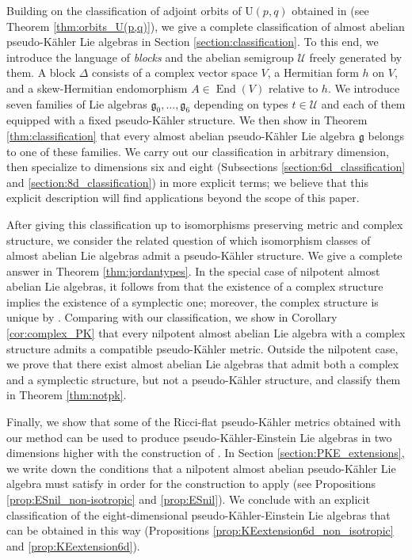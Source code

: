 \documentclass{article}
\theoremstyle{definition}
\DeclareMathOperator{\End}{End}
\newcommand{\frg}{\mathfrak{g}}
\begin{document}
Building on the classification of adjoint orbits of $\mathrm{U}(p,q)$ obtained in \cite{Burgoyne_Cushman_1977} (see Theorem \ref{thm:orbits_U(p,q)}), we give a complete classification of almost abelian pseudo-Kähler Lie algebras in Section \ref{section:classification}. To this end, we introduce the language of \emph{blocks} and the abelian semigroup $\mathcal{U}$ freely generated by them. A block $\Delta$ consists of a complex vector space $V$, a Hermitian form $h$ on $V$, and a skew-Hermitian endomorphism $A\in\End(V)$ relative to $h$. We introduce seven families of Lie algebras $\frg_0,\ldots,\frg_6$ depending on types $t\in\mathcal{U}$ and each of them equipped with a fixed pseudo-Kähler structure. We then show in Theorem \ref{thm:classification} that every almost abelian pseudo-Kähler Lie algebra $\frg$ belongs to one of these families. We carry out our classification in arbitrary dimension, then specialize to dimensions six and eight (Subsections \ref{section:6d_classification} and \ref{section:8d_classification}) in more explicit terms; we believe that this explicit description will find applications beyond the scope of this paper.\medskip

After giving this classification up to isomorphisms preserving metric and complex structure, we consider the related question of which isomorphism classes of almost abelian Lie algebras admit a pseudo-Kähler structure. We give a complete answer in Theorem \ref{thm:jordantypes}. In the special case of nilpotent almost abelian Lie algebras, it follows from \cite{ArroyoBarberisDiazGodoyHernandez} that the existence of a complex structure implies the existence of a symplectic one; moreover, the complex structure is unique by \cite{AABRW25}. Comparing with our classification, we show in Corollary \ref{cor:complex_PK} that every nilpotent almost abelian Lie algebra with a complex structure admits a compatible pseudo-Kähler metric. Outside the nilpotent case, we prove that there exist almost abelian Lie algebras that admit both a complex and a symplectic structure, but not a pseudo-Kähler structure, and classify them in Theorem \ref{thm:notpk}.\medskip

Finally, we show that some of the Ricci-flat pseudo-Kähler metrics obtained with our method can be used to produce pseudo-Kähler-Einstein Lie algebras in two dimensions higher with the construction of \cite{Conti_Rossi_SegnanDalmasso_2023}. In Section \ref{section:PKE_extensions}, we write down the conditions that a nilpotent almost abelian pseudo-Kähler Lie algebra must satisfy in order for the construction to apply (see Propositions \ref{prop:ESnil_non-isotropic} and \ref{prop:ESnil}). We conclude with an explicit classification of the eight-dimensional pseudo-Kähler-Einstein Lie algebras that can be obtained in this way (Propositions \ref{prop:KEextension6d_non_isotropic} and \ref{prop:KEextension6d}).
\end{document}
